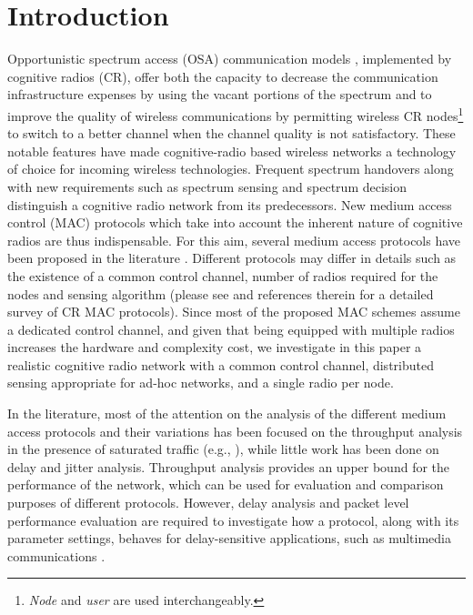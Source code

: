 \documentclass[12pt,journal,oneside,onecolumn]{IEEEtran}
\begin{document}
\section{Introduction}
\label {sec:intro}

Opportunistic spectrum access (OSA) communication models \cite{zhao07a}, implemented by cognitive radios (CR), offer both the capacity to decrease the communication infrastructure expenses by using the vacant portions of the spectrum and to improve the quality of wireless communications by permitting wireless CR nodes\footnote{\emph{Node} and \emph{user} are used interchangeably.} to switch to a better channel when the channel quality is not satisfactory. These notable features have made cognitive-radio based wireless networks a technology of choice for incoming wireless technologies.
Frequent spectrum handovers along with new requirements such as spectrum sensing and spectrum decision distinguish a cognitive radio network from its predecessors. New medium access control (MAC) protocols which take into account the inherent nature of cognitive radios are thus indispensable. For this aim, several  medium access protocols have been proposed in the literature \cite{zhao07,jia08,cordeiro07}. Different protocols may differ in details such as the existence of a common control channel, number of radios required for the nodes and sensing algorithm (please see \cite{cormio09,pawelczak09} and references therein for a detailed survey of CR MAC protocols). Since most of the proposed MAC schemes assume a dedicated control channel, and given that being equipped with multiple radios increases the hardware and complexity cost, we investigate in this paper a realistic cognitive radio network with a common control channel, distributed sensing appropriate for ad-hoc networks, and a single radio per node. 

In the literature, most of the attention on the analysis of the different medium access protocols and their variations has been focused on the throughput analysis in the presence of saturated traffic (e.g., \cite{pawelczak09,park11,zhao07,pawelczak08,jia08,cordeiro07}), while little work has been done on delay and jitter analysis. Throughput analysis provides an upper bound for the performance of the network, which can be used for evaluation and comparison purposes of different protocols. However, delay analysis and packet level performance evaluation are required to investigate how a protocol, along with its parameter settings, behaves for delay-sensitive applications, such as multimedia communications \cite{wang-l11,cisco13}.
\end{document}
